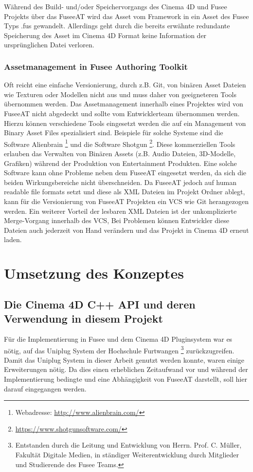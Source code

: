 \documentclass[pagesize, paper=a4, fontsize=12pt, titlepage=true, headings=small, headnosepline, abstractoff, liststotoc, nochapterprefix, plainheadsepline, twoside]{scrreprt}
\begin{document}
Während des Build- und/oder Speichervorgangs des Cinema 4D und Fusee Projekts über das FuseeAT wird das Asset vom Framework in ein Asset des Fusee Typs .fus gewandelt. Allerdings geht durch die bereits erwähnte redundante Speicherung des Asset im Cinema 4D Format keine Information der ursprünglichen Datei verloren.

\subsection{Assetmanagement in Fusee Authoring Toolkit}
Oft reicht eine einfache Versionierung, durch z.B. Git, von binären Asset Dateien wie Texturen oder Modellen nicht aus und muss daher von geeigneteren Tools übernommen werden. Das Assetmanagement innerhalb eines Projektes wird von FuseeAT nicht abgedeckt und sollte vom Entwicklerteam übernommen werden. Hierzu können verschiedene Tools eingesetzt werden die auf ein Management von Binary Asset Files spezialisiert sind. Beispiele für solche Systeme sind die Software Alienbrain \autocite{Alienbrain}\footnote{Webadresse: \url{http://www.alienbrain.com/}} und die Software Shotgun \autocite{Shotgun}\footnote{\url{https://www.shotgunsoftware.com/}}. Diese kommerziellen Tools erlauben das Verwalten von Binären Assets (z.B. Audio Dateien, 3D-Modelle, Grafiken) während der Produktion von Entertainment Produkten. Eine solche Software kann ohne Probleme neben dem FuseeAT eingesetzt werden, da sich die beiden Wirkungsbereiche nicht überschneiden.
Da FuseeAT jedoch auf human readable file formats setzt und diese als XML Dateien im Projekt Ordner ablegt, kann für die Versionierung von FuseeAT Projekten ein VCS wie Git herangezogen werden. Ein weiterer Vorteil der lesbaren XML Dateien ist der unkomplizierte Merge-Vorgang innerhalb des VCS, Bei Problemen können Entwickler diese Dateien auch jederzeit von Hand verändern und das Projekt in Cinema 4D erneut laden.

\chapter{Umsetzung des Konzeptes}
\section{Die Cinema 4D C++ API und deren Verwendung in diesem Projekt}
Für die Implementierung in Fusee und dem Cinema 4D Pluginsystem war es nötig, auf das Uniplug System der Hochschule Furtwangen \footnote{Entstanden durch die Leitung und Entwicklung von Herrn. Prof. C. Müller, Fakultät Digitale Medien, in ständiger Weiterentwicklung durch Mitglieder und Studierende des Fusee Teams.} zurückzugreifen. Damit das Uniplug System in dieser Arbeit genutzt werden konnte, waren einige Erweiterungen nötig. Da dies einen erheblichen Zeitaufwand vor und während der Implementierung bedingte und eine Abhängigkeit von FuseeAT darstellt, soll hier darauf eingegangen werden.
\end{document}
